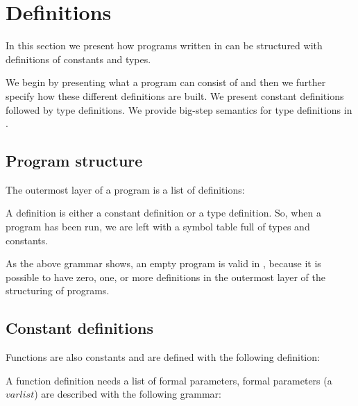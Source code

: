 \section{Definitions}
\label{sec:definitions}
In this section we present how programs written in \productname{} can be
structured with definitions of constants and types.

We begin by presenting what a program can consist of and then we further specify
how these different definitions are built. We present constant definitions
followed by type definitions. We provide big-step semantics for type definitions
in .

\subsection{Program structure}

The outermost layer of a \productname{} program is a list of definitions:

\begin{ebnf}
\end{ebnf}

A definition is either a constant definition or a type definition. So, when a
program has been run, we are left with a symbol table full of types and
constants.

As the above grammar shows, an empty program is valid in \productname{}, because
it is possible to have zero, one, or more definitions in the outermost layer of
the structuring of programs.

\subsection{Constant definitions}
\label{sec:constantdefinitions}

Functions are also constants and are defined with the following definition:

\begin{ebnf}
\end{ebnf}

A function definition needs a list of formal parameters, formal parameters (a
$varlist$) are described with the following grammar:

\begin{ebnf}
\end{ebnf}

